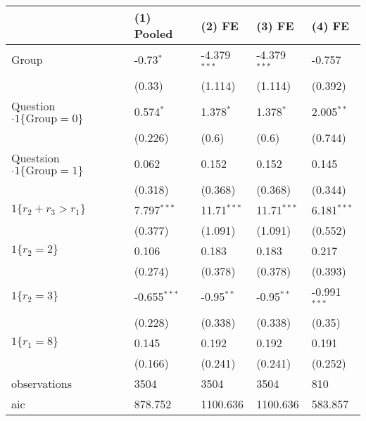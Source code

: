 \begin{tabular}{lllll}
\hline
 & (1) Pooled & (2) FE & (3) FE & (4) FE \\
\hline
Group & -0.73$^{*}$ & -4.379$^{***}$ & -4.379$^{***}$ & -0.757 \\
 & (0.33) & (1.114) & (1.114) & (0.392) \\
Question$\cdot1\{\text{Group}=0\}$ & 0.574$^{*}$ & 1.378$^{*}$ & 1.378$^{*}$ & 2.005$^{**}$ \\
 & (0.226) & (0.6) & (0.6) & (0.744) \\
Questsion$\cdot1\{\text{Group}=1\}$ & 0.062 & 0.152 & 0.152 & 0.145 \\
 & (0.318) & (0.368) & (0.368) & (0.344) \\
$1\{r_2 + r_3 > r_1\}$ & 7.797$^{***}$ & 11.71$^{***}$ & 11.71$^{***}$ & 6.181$^{***}$ \\
 & (0.377) & (1.091) & (1.091) & (0.552) \\
$1\{r_2 =2\}$ & 0.106 & 0.183 & 0.183 & 0.217 \\
 & (0.274) & (0.378) & (0.378) & (0.393) \\
$1\{r_2=3\}$ & -0.655$^{***}$ & -0.95$^{**}$ & -0.95$^{**}$ & -0.991$^{***}$ \\
 & (0.228) & (0.338) & (0.338) & (0.35) \\
$1\{r_1=8\}$ & 0.145 & 0.192 & 0.192 & 0.191 \\
 & (0.166) & (0.241) & (0.241) & (0.252) \\\hline

observations & 3504 & 3504 & 3504 & 810 \\
aic & 878.752 & 1100.636 & 1100.636 & 583.857 \\
\hline
\end{tabular}
